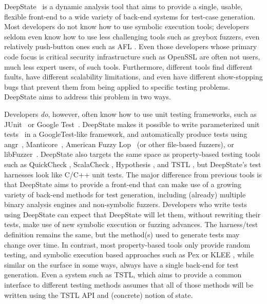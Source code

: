 DeepState~\cite{DeepState} is a dynamic analysis tool that aims to provide a single, usable, flexible front-end to a wide variety of back-end systems for test-case generation.  Most developers do not know how to use symbolic execution tools; developers seldom even know how to use less challenging tools such as greybox fuzzers, even relatively push-button ones such as AFL \cite{aflfuzz}.  Even those developers whose primary code focus is critical security infrastructure such as OpenSSL are often not users, much less expert users, of such tools.  Furthermore, different tools find different faults, have different scalability limitations, and even have different show-stopping bugs that prevent them from being applied to specific testing problems.  DeepState aims to address this problem in two ways.

Developers \emph{do}, however, often know how to use unit testing frameworks, such as JUnit~\cite{JUnit} or Google Test~\cite{GoogleTest}. DeepState makes it possible to write parameterized unit tests~\cite{ParamUnit} in a GoogleTest-like framework, and automatically produce tests using angr~\cite{angr1,angr2,angr3}, Manticore~\cite{Manticore}, American Fuzzy Lop~\cite{aflfuzz} (or other file-based fuzzers), or libFuzzer~\cite{libFuzzer}.  DeepState also targets the same space as property-based testing tools such as QuickCheck \cite{ClaessenH00}, ScalaCheck \cite{ScalaCheckDoc}, Hypothesis \cite{Hypothesis}, and TSTL \cite{NFM15,tstlsttt}, but DeepState's test harnesses look like C/C++ unit tests. The major difference from previous tools is that DeepState aims to provide a front-end that can make use of a growing variety of back-end methods for test generation, including (already) multiple binary analysis engines and non-symbolic fuzzers.  Developers who write tests using DeepState can expect that DeepState will let them, without rewriting their tests, make use of new symbolic execution or fuzzing advances.  The harness/test definition remains the same, but the method(s) used to generate tests may change over time.  In contrast, most property-based tools only provide random testing, and symbolic execution based approaches such as Pex \cite{Pex,UnitMeister} or KLEE \cite{KLEE}, while similar on the surface in some ways, always have a single back-end for test generation.  Even a system such as TSTL, which aims to provide a common interface \cite{WODACommon} to different testing methods assumes that all of those methods will be written using the TSTL API and (concrete) notion of state.

